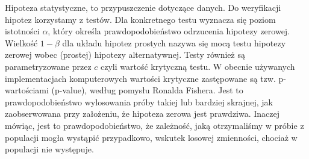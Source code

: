 \documentclass{../notatki}
\begin{document}
Hipoteza statystyczne, to przypuszczenie dotyczące danych. Do weryfikacji
hipotez korzystamy z testów. Dla konkretnego testu wyznacza się poziom
istotności $\alpha$, który określa prawdopodobieństwo odrzucenia hipotezy
zerowej. Wielkość $1-\beta$ dla układu hipotez prostych nazywa się mocą testu
hipotezy zerowej wobec (prostej) hipotezy alternatywnej. Testy również są
parametryzowane przez $c$ czyli wartość krytyczną testu. W obecnie używanych
implementacjach komputerowych wartości krytyczne zastępowane są tzw.
p-wartościami (p-value), według pomysłu Ronalda Fishera. Jest to
prawdopodobieństwo wylosowania próby takiej lub bardziej skrajnej, jak
zaobserwowana przy założeniu, że hipoteza zerowa jest prawdziwa. Inaczej mówiąc,
jest to prawdopodobieństwo, że zależność, jaką otrzymaliśmy w próbie z populacji
mogła wystąpić przypadkowo, wskutek losowej zmienności, chociaż w populacji nie
występuje.
\end{document}
